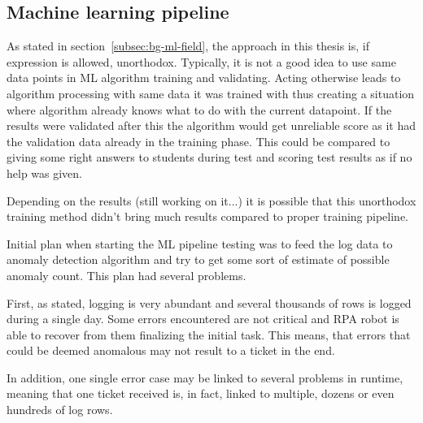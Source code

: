 



\subsection{Machine learning pipeline}\label{subsec:meth-ml-pipeline}

As stated in section~\ref{subsec:bg-ml-field},
the approach in this thesis is,
if expression is allowed, unorthodox.
Typically,
it is not a good idea to use
same data points in ML algorithm training and validating.
Acting otherwise
leads to algorithm processing with
same data it was trained with
thus creating a situation
where algorithm already knows what to do with the current datapoint.
If the results were validated after this
the algorithm would get unreliable score
as it had the validation data already in the training phase.
This could be compared to
giving some right answers to students
during test and scoring test results as if
no help was given.


\begin{itcomment}
    Depending on the results (still working on it...)
    it is possible that this unorthodox training method didn't bring much results
    compared to proper training pipeline.
\end{itcomment}

Initial plan when starting the ML pipeline testing
was to feed the log data to anomaly detection algorithm
and try to get some sort of estimate of possible anomaly count.
This plan had several problems.

First, as stated, logging is very abundant
and several thousands of rows is logged
during a single day.
Some errors encountered are not critical
and RPA robot is able to recover from them
finalizing the initial task.
This means, that errors that could be deemed anomalous
may not result to a ticket in the end.

In addition,
one single error case
may be linked to several problems in runtime,
meaning that one ticket received is,
in fact, linked to multiple, dozens or
even hundreds of log rows.

